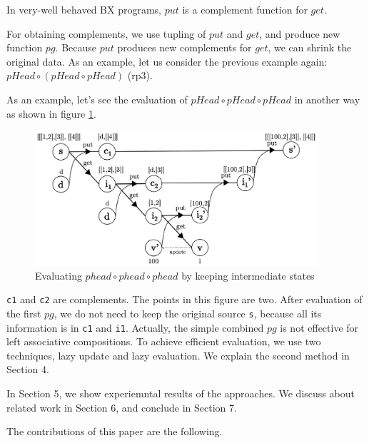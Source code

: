 \vspace{2mm}
In very-well behaved BX programs, 
$put$ is a complement function for $get$.
\vspace{2mm}

For obtaining complements, we use tupling of $put$ and $get$, and produce new function $pg$. Because $put$ produces new complements for $get$, we can shrink the original data.
As an example, let us consider the previous example again: $pHead \circ (pHead \circ pHead)$ (rp3).


As an example, let's see the evaluation of $pHead \circ pHead \circ pHead$ in another way as shown in figure \ref{fig:eval-comp-phead-2}.

\begin{figure}[!htb]
  \centering
  \includegraphics[height=5cm]{./fig/fig3.eps}
  \caption{Evaluating $phead \circ phead \circ phead$ by keeping intermediate states}
  \label{fig:eval-comp-phead-2}
\end{figure}

\texttt{c1} and \texttt{c2} are complements. The points in this figure are two. After evaluation of the first $pg$, we do not need to keep the original source \texttt{s}, because all its information is in \texttt{c1} and \texttt{i1}. 
Actually, the simple combined $pg$ is not effective for left associative compositions. To achieve efficient evaluation, we use two techniques, lazy update and lazy evaluation. We explain the second method in Section 4.

In Section 5, we show experiemntal results of the approaches. We discuss about related work in Section 6, and conclude in Section 7.


The contributions of this paper are the following.

